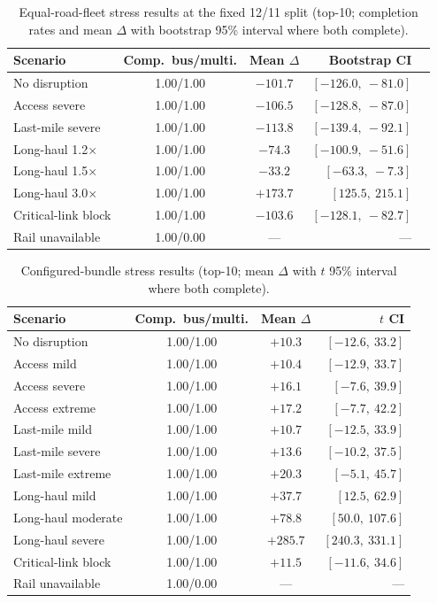 \documentclass{ieeeaccess}
\begin{document}
\begin{table}[!t]
\caption{Equal-road-fleet stress results at the fixed 12/11 split (top-10; completion rates and mean $\Delta$ with bootstrap 95\% interval where both complete).}
\label{tab:stress}
\centering
\footnotesize
\begin{tabular}{@{}lccrr@{}}
\hline
Scenario & Comp.\ bus/multi. & Mean $\Delta$ & Bootstrap CI \\
\hline
No disruption & 1.00/1.00 & $-101.7$ & $[-126.0,\ -81.0]$ \\
Access severe & 1.00/1.00 & $-106.5$ & $[-128.8,\ -87.0]$ \\
Last-mile severe & 1.00/1.00 & $-113.8$ & $[-139.4,\ -92.1]$ \\
Long-haul 1.2$\times$ & 1.00/1.00 & $-74.3$ & $[-100.9,\ -51.6]$ \\
Long-haul 1.5$\times$ & 1.00/1.00 & $-33.2$ & $[-63.3,\ -7.3]$ \\
Long-haul 3.0$\times$ & 1.00/1.00 & $+173.7$ & $[125.5,\ 215.1]$ \\
Critical-link block & 1.00/1.00 & $-103.6$ & $[-128.1,\ -82.7]$ \\
Rail unavailable & 1.00/0.00 & --- & --- \\
\hline
\end{tabular}
\end{table}

\begin{table}[!t]
\caption{Configured-bundle stress results (top-10; mean $\Delta$ with $t$ 95\% interval where both complete).}
\label{tab:stressconf}
\centering
\footnotesize
\begin{tabular}{@{}lccr@{}}
\hline
Scenario & Comp.\ bus/multi. & Mean $\Delta$ & $t$ CI \\
\hline
No disruption & 1.00/1.00 & $+10.3$ & $[-12.6,\ 33.2]$ \\
Access mild & 1.00/1.00 & $+10.4$ & $[-12.9,\ 33.7]$ \\
Access severe & 1.00/1.00 & $+16.1$ & $[-7.6,\ 39.9]$ \\
Access extreme & 1.00/1.00 & $+17.2$ & $[-7.7,\ 42.2]$ \\
Last-mile mild & 1.00/1.00 & $+10.7$ & $[-12.5,\ 33.9]$ \\
Last-mile severe & 1.00/1.00 & $+13.6$ & $[-10.2,\ 37.5]$ \\
Last-mile extreme & 1.00/1.00 & $+20.3$ & $[-5.1,\ 45.7]$ \\
Long-haul mild & 1.00/1.00 & $+37.7$ & $[12.5,\ 62.9]$ \\
Long-haul moderate & 1.00/1.00 & $+78.8$ & $[50.0,\ 107.6]$ \\
Long-haul severe & 1.00/1.00 & $+285.7$ & $[240.3,\ 331.1]$ \\
Critical-link block & 1.00/1.00 & $+11.5$ & $[-11.6,\ 34.6]$ \\
Rail unavailable & 1.00/0.00 & --- & --- \\
\hline
\end{tabular}
\end{table}
\end{document}
